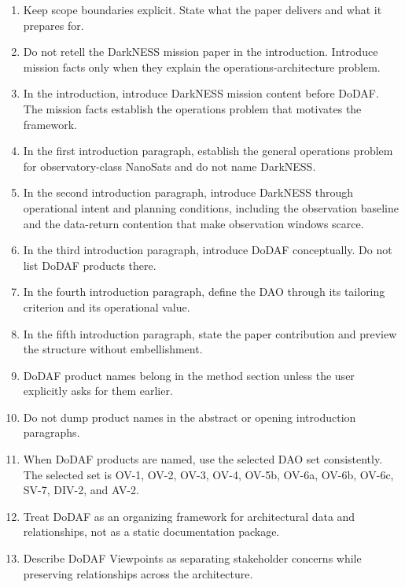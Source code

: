 \documentclass[11pt]{article}
\begin{document}
\begin{enumerate}
\item Keep scope boundaries explicit. State what the paper delivers and what it prepares for.

\item Do not retell the DarkNESS mission paper in the introduction. Introduce mission facts only when they explain the operations-architecture problem.

\item In the introduction, introduce DarkNESS mission content before DoDAF. The mission facts establish the operations problem that motivates the framework.

\item In the first introduction paragraph, establish the general operations problem for observatory-class NanoSats and do not name DarkNESS.

\item In the second introduction paragraph, introduce DarkNESS through operational intent and planning conditions, including the observation baseline and the data-return contention that make observation windows scarce.

\item In the third introduction paragraph, introduce DoDAF conceptually. Do not list DoDAF products there.

\item In the fourth introduction paragraph, define the DAO through its tailoring criterion and its operational value.

\item In the fifth introduction paragraph, state the paper contribution and preview the structure without embellishment.

\item DoDAF product names belong in the method section unless the user explicitly asks for them earlier.

\item Do not dump product names in the abstract or opening introduction paragraphs.

\item When DoDAF products are named, use the selected DAO set consistently. The selected set is OV-1, OV-2, OV-3, OV-4, OV-5b, OV-6a, OV-6b, OV-6c, SV-7, DIV-2, and AV-2.

\item Treat DoDAF as an organizing framework for architectural data and relationships, not as a static documentation package.

\item Describe DoDAF Viewpoints as separating stakeholder concerns while preserving relationships across the architecture.


\end{enumerate}
\end{document}
